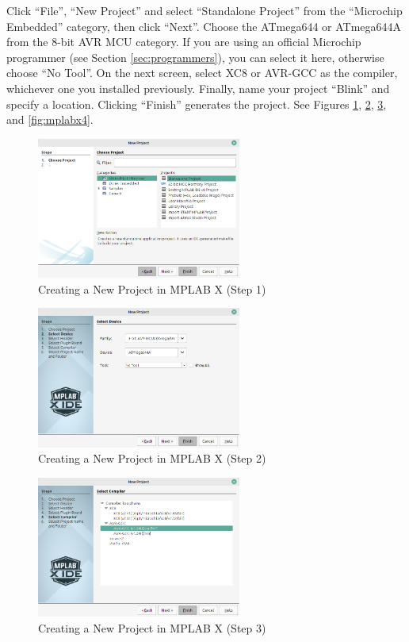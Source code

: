\documentclass{article}
\begin{document}
Click ``File'', ``New Project'' and select ``Standalone Project'' from the ``Microchip Embedded'' category, then click ``Next''. Choose the ATmega644 or ATmega644A from the 8-bit AVR MCU category. If you are using an official Microchip programmer (see Section \ref{sec:programmers}), you can select it here, otherwise choose ``No Tool''. On the next screen, select XC8 or AVR-GCC as the compiler, whichever one you installed previously. Finally, name your project ``Blink'' and specify a location. Clicking ``Finish'' generates the project. See Figures \ref{fig:mplabx1}, \ref{fig:mplabx2}, \ref{fig:mplabx3}, and \ref{fig:mplabx4}. 

\begin{figure}[htb]
\centering
\includegraphics[width=0.6\textwidth]{Pictures/MPLABX1.png}
\caption{Creating a New Project in MPLAB X (Step 1)}
\label{fig:mplabx1}
\end{figure}

\begin{figure}[htb]
\centering
\includegraphics[width=0.6\textwidth]{Pictures/MPLABX2.png}
\caption{Creating a New Project in MPLAB X (Step 2)}
\label{fig:mplabx2}
\end{figure}

\begin{figure}[htb]
\centering
\includegraphics[width=0.6\textwidth]{Pictures/MPLABX3.png}
\caption{Creating a New Project in MPLAB X (Step 3)}
\label{fig:mplabx3}
\end{figure}
\end{document}
